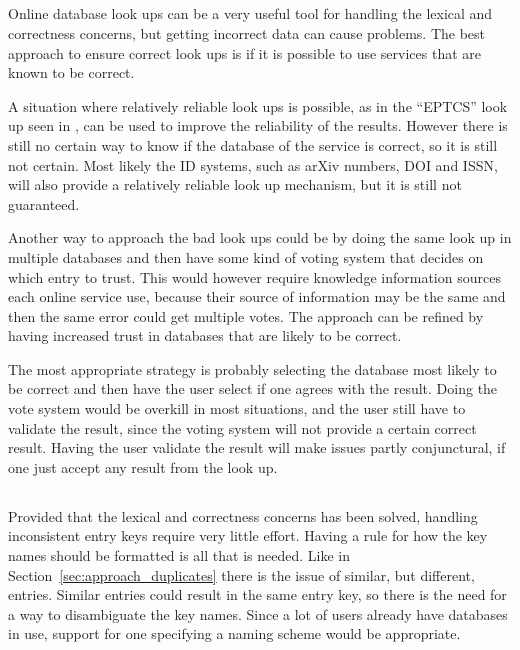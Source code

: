 \subsection{}
\label{sec:approach_look_ups}

Online database look ups can be a very useful tool for handling the
lexical and correctness concerns, but getting incorrect data can cause
problems.  The best approach to ensure correct look ups is if it is
possible to use services that are known to be correct.

A situation where relatively reliable look ups is possible, as in the
``EPTCS'' look up seen in , can be used to
improve the reliability of the results.  However there is still no
certain way to know if the database of the service is correct, so it
is still not certain.  Most likely the ID systems, such as arXiv
numbers, DOI and ISSN, will also provide a relatively reliable look up
mechanism, but it is still not guaranteed.

Another way to approach the bad look ups could be by doing the same
look up in multiple databases and then have some kind of voting system
that decides on which entry to trust.  This would however require
knowledge information sources each online service use, because their
source of information may be the same and then the same error could
get multiple votes.  The approach can be refined by having increased
trust in databases that are likely to be correct.

The most appropriate strategy is probably selecting the database most
likely to be correct and then have the user select if one agrees with
the result.  Doing the vote system would be overkill in most
situations, and the user still have to validate the result, since the
voting system will not provide a certain correct result.  Having the
user validate the result will make issues partly conjunctural, if one
just accept any result from the look up.


\subsection{}

Provided that the lexical and correctness concerns has been solved,
handling inconsistent entry keys require very little effort.  Having a
rule for how the key names should be formatted is all that is needed.
Like in Section~\ref{sec:approach_duplicates} there is the issue of
similar, but different, entries.  Similar entries could result in the
same entry key, so there is the need for a way to disambiguate the key
names.  Since a lot of users already have databases in use, support
for one specifying a naming scheme would be appropriate.


